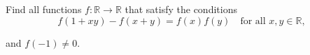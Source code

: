Find all functions 
$f:\mathbb{R} \rightarrow \mathbb{R}$
 that satisfy the conditions
\[f(1+xy)-f(x+y)=f(x)f(y) \quad \text{for all } x,y \in \mathbb{R},\]


and 
$f(-1) \neq 0$.
